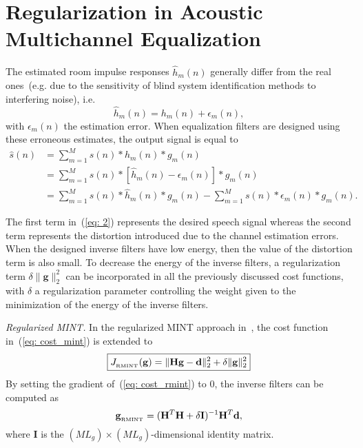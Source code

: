 \documentclass{article}
\begin{document}
\section{Regularization in Acoustic Multichannel Equalization}
\vspace{-0.2cm}

The estimated room impulse responses $\hat{h}_m(n)$ generally differ from the real ones~(e.g. due to the sensitivity of blind system identification methods to interfering noise), i.e.
\begin{equation}
\hat{h}_m(n) = h_m(n)+\epsilon_m(n),
\end{equation}
with $\epsilon_m(n)$ the estimation error.
When equalization filters are designed using these erroneous estimates, the output signal is equal to
\begingroup
\fontsize{7.7pt}{7.7pt}\selectfont
\begin{align}
\hat{s}(n)  & =\!\! \sum_{m=1}^M s(n) \ast h_m(n) \ast g_m(n) \\
& = \!\! \sum_{m=1}^M s(n) \ast \left[\hat{h}_m(n) - \epsilon_m(n)\right] \ast g_m(n) \\
\label{eq: 2}
 &  = \!\! \sum_{m=1}^M s(n) \ast \hat{h}_m(n) \ast g_m(n) - \sum_{m=1}^M s(n) \ast \epsilon_m(n) \ast g_m(n).
\end{align}
\endgroup

\noindent
The first term in~(\ref{eq: 2}) represents the desired speech signal whereas the second term represents the distortion introduced due to the channel estimation errors. 
When the designed inverse filters have low energy, then the value of the distortion term is also small.
To decrease the energy of the inverse filters, a regularization term $\delta \|\mathbf{g}\|_2^2$ can be incorporated in all the previously discussed cost functions, with $\delta$ a regularization parameter controlling the weight given to the minimization of the energy of the inverse filters.

\smallskip \noindent \textit{Regularized MINT.} \enspace In the regularized MINT approach in~\cite{Hikichi_EURASIP_2007}, the cost function in~(\ref{eq: cost_mint}) is extended to
\begin{equation}
\label{eq: cost_rmint}
\boxed{J_{{}_{\rm RMINT}}(\mathbf{g}) = \|\mathbf{H}\mathbf{g} - \mathbf{d}\|_2^2 + \delta \|\mathbf{g} \|_2^2} 
\end{equation}
By setting the gradient of~(\ref{eq: cost_rmint}) to $0$, %
the inverse filters can be computed as
\begin{equation}
\label{eq: rmint_sol}
\mathbf{g}_{{}_{\rm RMINT}}  = (\mathbf{H}^T\mathbf{H}+\delta \mathbf{I})^{-1}\mathbf{H}^{T}\mathbf{d},
\end{equation}
where $\mathbf{I}$ is the $(ML_g) \times (ML_g)$-dimensional identity matrix. 
\end{document}
